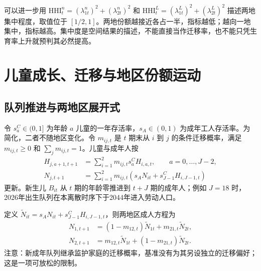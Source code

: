 \documentclass[UTF8,a4paper,zihao=-4,fontset=windows]{ctexart}
\numberwithin{equation}{section}
\begin{document}
可以进一步用 $\mathrm{HHI}^n_t=(\lambda^n_{1t})^2+(\lambda^n_{2t})^2$ 和 $\mathrm{HHI}^L_t=(\lambda^L_{1t})^2+(\lambda^L_{2t})^2$ 描述两地集中程度，取值位于 $[1/2,1]$。两地份额越接近各占一半，指标越低；越向一地集中，指标越高。集中度是空间结果的描述，不能直接当作迁移率，也不能只凭生育率上升就预判其必然提高。

\section{儿童成长、迁移与地区份额运动}
\label{sec:share-dynamics}
\subsection{队列推进与两地区展开式}
令 $s^C_a\in(0,1]$ 为年龄 $a$ 儿童的一年存活率，$s_A\in(0,1)$ 为成年工人存活率。为简化，二者不随地区变化。令 $m_{ij,t}$ 是 $t$ 期末从 $i$ 到 $j$ 的条件迁移概率，满足 $m_{ij,t}\geq0$ 和 $\sum_jm_{ij,t}=1$。儿童与成年人按
\begin{align}
 H_{j,a+1,t+1}&=\sum_{i=1}^2m_{ij,t}s^C_aH_{i,a,t},
 \qquad a=0,\ldots,J-2, \label{eq:child-transition}\\
 N_{j,t+1}&=\sum_{i=1}^2m_{ij,t}
 \left(s_AN_{it}+s^C_{J-1}H_{i,J-1,t}\right)
 \label{eq:adult-transition}
\end{align}
更新。新生儿 $B_{it}$ 从 $t$ 期的年龄零推进到 $t+J$ 期的成年人；例如 $J=18$ 时，2026年出生队列在本离散时序下于2044年进入劳动人口。

定义 $\widetilde N_{it}=s_AN_{it}+s^C_{J-1}H_{i,J-1,t}$，则两地区成人方程为
\begin{align}
 N_{1,t+1}&=(1-m_{12,t})\widetilde N_{1t}+m_{21,t}\widetilde N_{2t},\\
 N_{2,t+1}&=m_{12,t}\widetilde N_{1t}+(1-m_{21,t})\widetilde N_{2t}.
 \label{eq:two-region-pop}
\end{align}
注意：新成年队列继承监护家庭的迁移概率，基准没有为其另设独立的迁移偏好；这是一项可放松的限制。
\end{document}
